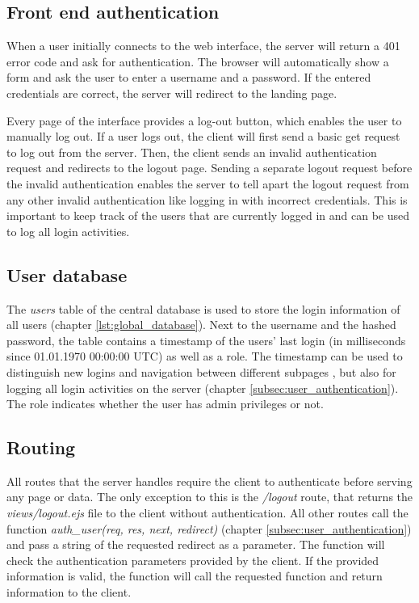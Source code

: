 \subsection{Front end authentication}
\label{subsec:front_end_authentication}
When a user initially connects to the web interface, the server will return a 401 error code and ask for authentication. The browser will automatically show a form and ask the user to enter a username and a password. If the entered credentials are correct, the server will redirect to the landing page.

Every page of the interface provides a log-out button, which enables the user to manually log out. 
If a user logs out, the client will first send a basic get request to log out from the server. Then, the client sends an invalid authentication request and redirects to the logout page.
Sending a separate logout request before the invalid authentication enables the server to tell apart the logout request from any other invalid authentication like logging in with incorrect credentials. This is important to keep track of the users that are currently logged in and can be used to log all login activities.



\subsection{User database}
\label{subsec:user_database}

The \textit{users} table of the central database is used to store the login information of all users (chapter \ref{lst:global_database}). Next to the username and the hashed password, the table contains a timestamp of the users' last login (in milliseconds since 01.01.1970 00:00:00 UTC) as well as a role. The timestamp can be used to distinguish new logins and navigation between different subpages , but also for logging all login activities on the server (chapter \ref{subsec:user_authentication}). The role indicates whether the user has admin privileges or not.



\subsection{Routing}
\label{subsec:routing}
All routes that the server handles require the client to authenticate before serving any page or data. The only exception to this is the \textit{/logout} route, that returns the \textit{views/logout.ejs} file to the client without authentication. All other routes call the function \textit{auth\_user(req, res, next, redirect)} (chapter \ref{subsec:user_authentication}) and pass a string of the requested redirect as a parameter. The function will check the authentication parameters provided by the client. If the provided information is valid, the function will call the requested function and return information to the client.



